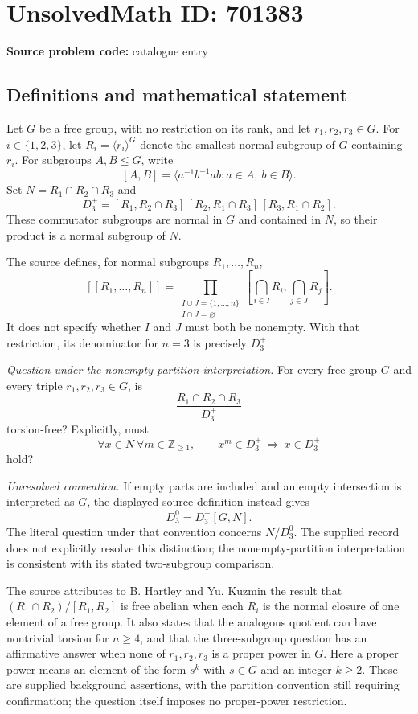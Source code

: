 \documentclass[11pt]{article}
\newcommand{\Z}{\mathbb{Z}}
\begin{document}
\section*{UnsolvedMath ID: 701383}
\textbf{Source problem code:} catalogue entry
\subsection{Definitions and mathematical statement}
Let \(G\) be a free group, with no restriction on its rank, and let \(r_1,r_2,r_3\in G\). For \(i\in\{1,2,3\}\), let \(R_i=\langle r_i\rangle^G\) denote the smallest normal subgroup of \(G\) containing \(r_i\). For subgroups \(A,B\leq G\), write
\[
[A,B]=\langle a^{-1}b^{-1}ab : a\in A,\ b\in B\rangle.
\]
Set \(N=R_1\cap R_2\cap R_3\) and
\[
D_3^{+}=[R_1,R_2\cap R_3]\,[R_2,R_1\cap R_3]\,[R_3,R_1\cap R_2].
\]
These commutator subgroups are normal in \(G\) and contained in \(N\), so their product is a normal subgroup of \(N\).

The source defines, for normal subgroups \(R_1,\ldots,R_n\),
\[
[[R_1,\ldots,R_n]]
=\prod_{\substack{I\cup J=\{1,\ldots,n\}\\ I\cap J=\varnothing}}
\left[\bigcap_{i\in I}R_i,\bigcap_{j\in J}R_j\right].
\]
It does not specify whether \(I\) and \(J\) must both be nonempty. With that restriction, its denominator for \(n=3\) is precisely \(D_3^{+}\).

\emph{Question under the nonempty-partition interpretation.} For every free group \(G\) and every triple \(r_1,r_2,r_3\in G\), is
\[
\frac{R_1\cap R_2\cap R_3}{D_3^{+}}
\]
torsion-free? Explicitly, must
\[
\forall x\in N\ \forall m\in\Z_{\geq1},\qquad
x^m\in D_3^{+}\ \Longrightarrow\ x\in D_3^{+}
\]
hold?

\emph{Unresolved convention.} If empty parts are included and an empty intersection is interpreted as \(G\), the displayed source definition instead gives
\[
D_3^{0}=D_3^{+}[G,N].
\]
The literal question under that convention concerns \(N/D_3^{0}\). The supplied record does not explicitly resolve this distinction; the nonempty-partition interpretation is consistent with its stated two-subgroup comparison.

The source attributes to B. Hartley and Yu. Kuzmin the result that \((R_1\cap R_2)/[R_1,R_2]\) is free abelian when each \(R_i\) is the normal closure of one element of a free group. It also states that the analogous quotient can have nontrivial torsion for \(n\geq4\), and that the three-subgroup question has an affirmative answer when none of \(r_1,r_2,r_3\) is a proper power in \(G\). Here a proper power means an element of the form \(s^k\) with \(s\in G\) and an integer \(k\geq2\). These are supplied background assertions, with the partition convention still requiring confirmation; the question itself imposes no proper-power restriction.
\end{document}
